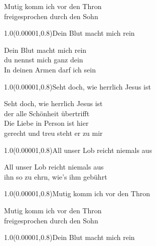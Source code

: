 \documentclass[aspectratio=169]{beamer}
\begin{document}
\begin{frame}
\centering
\color{white}
\huge{Mutig komm ich vor den Thron} \\
\huge{freigesprochen durch den Sohn} \\

\begin{textblock}{1.0}(0.00001,0.8)\color{gray}\normalsize{Dein Blut macht mich rein}\end{textblock}
\end{frame}

\begin{frame}
\centering
\color{white}
\huge{Dein Blut macht mich rein} \\
\huge{du nennst mich ganz dein} \\
\huge{In deinen Armen darf ich sein} \\

\begin{textblock}{1.0}(0.00001,0.8)\color{gray}\normalsize{Seht doch, wie herrlich Jesus ist}\end{textblock}
\end{frame}

\begin{frame}
\centering
\color{white}
\huge{Seht doch, wie herrlich Jesus ist} \\
\huge{der alle Schönheit übertrifft} \\
\huge{Die Liebe in Person ist hier} \\
\huge{gerecht und treu steht er zu mir} \\

\begin{textblock}{1.0}(0.00001,0.8)\color{gray}\normalsize{All unser Lob reicht niemals aus}\end{textblock}
\end{frame}

\begin{frame}
\centering
\color{white}
\huge{All unser Lob reicht niemals aus} \\
\huge{ihn so zu ehrn, wie’s ihm gebührt} \\

\begin{textblock}{1.0}(0.00001,0.8)\color{gray}\normalsize{Mutig komm ich vor den Thron}\end{textblock}
\end{frame}

\begin{frame}
\centering
\color{white}
\huge{Mutig komm ich vor den Thron} \\
\huge{freigesprochen durch den Sohn} \\

\begin{textblock}{1.0}(0.00001,0.8)\color{gray}\normalsize{Dein Blut macht mich rein}\end{textblock}
\end{frame}
\end{document}
